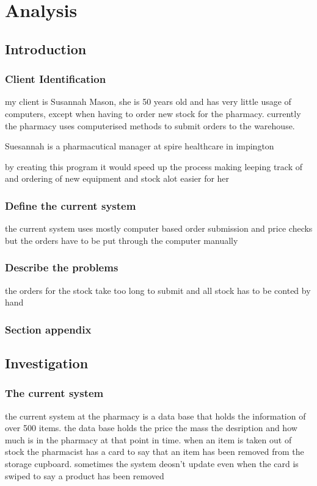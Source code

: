 \chapter{Analysis}

\section{Introduction}

\subsection{Client Identification}
my client is Susannah Mason, she is 50 years old and has very little usage of computers, except when having to order new stock for the pharmacy. currently the pharmacy uses computerised methods to submit orders to the warehouse.

Suesannah is a pharmacutical manager at spire healthcare in impington 

by  creating this program it would speed up the process making leeping track of and ordering of new equipment and stock alot easier for her 
\subsection{Define the current system}
 the current system uses mostly computer based order submission and price checks but the orders have to be put through the computer manually 
\subsection{Describe the problems}
the orders for the stock take too long to submit and all stock has to be conted by hand 
\subsection{Section appendix}

\section{Investigation}

\subsection{The current system}
the current system at the pharmacy is a data base that holds the information of over 500 items. the data base holds the price the mass the desription and how much is in the pharmacy at that point in time. when an item is taken out of stock the pharmacist has a card to say that an item has been removed from the storage cupboard. sometimes the system deosn't update even when the card is swiped to say a product has been removed
